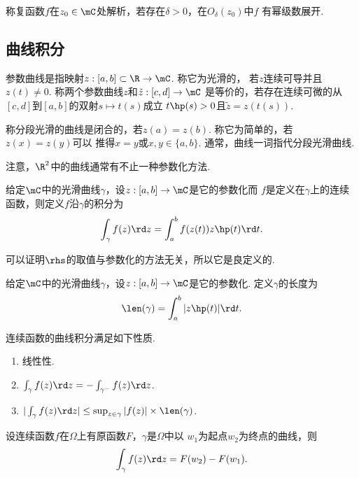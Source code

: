   \begin{defi}[解析]
    称复函数$f$在$z_0\in\mC$处解析，若存在$\delta>0$，在$O_\delta(z_0)$中$f$
    有幂级数展开.
  \end{defi}

\subsection{曲线积分}

  \begin{defi}[参数曲线]
    参数曲线是指映射$z:[a,b]\subset\R\to\mC$. 称它为光滑的，
    若$z$连续可导并且$z(t)\ne 0$. 称两个参数曲线$z$和$\tilde{z}:[c,d]\to\mC$
    是等价的，若存在连续可微的从$[c,d]$到$[a,b]$的双射$s\mapsto t(s)$成立
    $t\hp(s)>0$且$\tilde{z}=z(t(s))$.\par
    称分段光滑的曲线是闭合的，若$z(a)=z(b)$. 称它为简单的，若$z(x)=z(y)$可以
    推得$x=y$或$x,y\in\{a, b\}$. 通常，曲线一词指代分段光滑曲线.
  \end{defi}
  \remark
    注意，$\R^2$中的曲线通常有不止一种参数化方法.

  \begin{defi}[曲线积分]
    给定$\mC$中的光滑曲线$\gamma$，设$z:[a,b]\to\mC$是它的参数化而
    $f$是定义在$\gamma$上的连续函数，则定义$f$沿$\gamma$的积分为
    \[
      \int_\gamma f(z)\rd z = \int_a^b f(z(t))z\hp(t)\rd t.
    \]
  \end{defi}
  \remark
    可以证明$\rhs$的取值与参数化的方法无关，所以它是良定义的.

  \begin{defi}[曲线长度]
    给定$\mC$中的光滑曲线$\gamma$，设$z:[a,b]\to\mC$是它的参数化.
    定义$\gamma$的长度为
    \[
      \len(\gamma) = \int_a^b|z\hp(t)|\rd t.
    \]
  \end{defi}

  \begin{thm}
    连续函数的曲线积分满足如下性质.
    \begin{enumerate}
      \item 线性性.
      \item $\int_\gamma f(z)\rd z = -\int_{\gamma^-}f(z)\rd z$.
      \item $|\int_\gamma f(z)\rd z| \le \sup_{z\in\gamma}|f(z)|\times\len(\gamma)$.
    \end{enumerate}
  \end{thm}

  \begin{thm}
    设连续函数$f$在$\Omega$上有原函数$F$，$\gamma$是$\Omega$中以
    $w_1$为起点$w_2$为终点的曲线，则
    \[
      \int_\gamma f(z)\rd z = F(w_2) - F(w_1).
    \]
  \end{thm}

